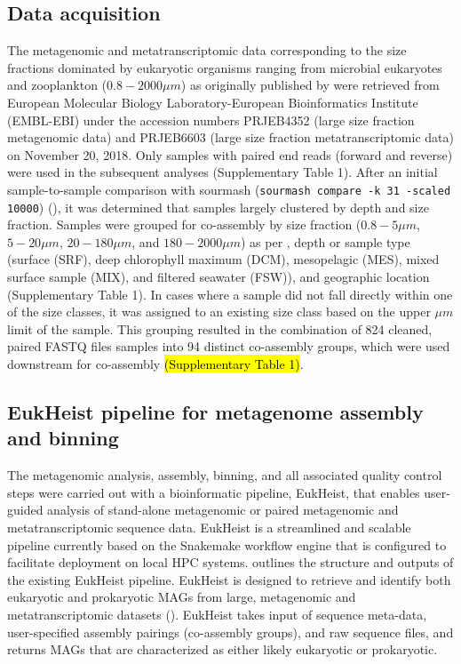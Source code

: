 \documentclass[12pt]{article}
\numberwithin{equation}{section}
\begin{document}
\subsection*{Data acquisition} The metagenomic and metatranscriptomic data corresponding to the size fractions dominated by eukaryotic organisms ranging from ﻿microbial eukaryotes and zooplankton ($0.8 -  2000 \mu m$) as originally published by \citet{Carradec2018global} were retrieved from ﻿European Molecular Biology Laboratory-European Bioinformatics Institute (EMBL-EBI) under the accession numbers PRJEB4352 (large size fraction metagenomic data) and PRJEB6603 (large size fraction metatranscriptomic data) on November 20, 2018. Only samples with paired end reads (forward and reverse) were used in the subsequent analyses (Supplementary Table 1). After an initial sample-to-sample comparison with sourmash (\texttt{sourmash compare -k 31 -scaled 10000}) \citep{Titus_Brown_2016} (), it was determined that samples largely clustered by depth and size fraction. Samples were grouped for co-assembly by size fraction ($0.8 - 5 \mu m$, $5-20 \mu m$, $20-180 \mu m$, and $180-2000 \mu m$) as per \citet{Carradec2018global}, depth or sample type (surface (SRF), deep chlorophyll maximum (DCM), mesopelagic (MES), mixed surface sample (MIX), and filtered seawater (FSW)), and geographic location (Supplementary Table 1). In cases where a sample did not fall directly within one of the size classes, it was assigned to an existing size class based on the upper $\mu m$ limit of the sample. This grouping resulted in the combination of 824 cleaned, paired FASTQ files samples into 94 distinct co-assembly groups, which were used downstream for co-assembly \hl{(Supplementary Table 1)}. 

\subsection*{EukHeist pipeline for metagenome assembly and binning}The metagenomic analysis, assembly, binning, and all associated quality control steps were carried out with a bioinformatic pipeline, EukHeist, that enables user-guided analysis of stand-alone metagenomic or paired metagenomic and metatranscriptomic sequence data. EukHeist is a streamlined and scalable pipeline currently based on the Snakemake workflow engine \citep{Koster2012} that is configured to facilitate deployment on local HPC systems.  outlines the structure and outputs of the existing EukHeist pipeline. EukHeist is designed to retrieve and identify both eukaryotic and prokaryotic MAGs from large, metagenomic and metatranscriptomic datasets (). EukHeist takes input of sequence meta-data, user-specified assembly pairings (co-assembly groups), and raw sequence files, and returns MAGs that are characterized as either likely eukaryotic or prokaryotic. 
\end{document}
